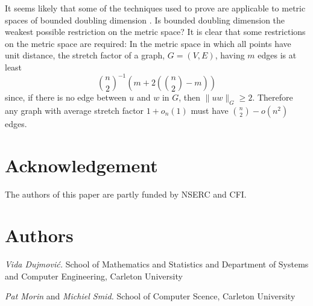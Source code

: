 \documentclass{patmorin}
\begin{document}
It seems likely that some of the techniques used to prove
 are applicable to metric spaces of bounded doubling
dimension \cite[Section~10.13]{heinonen:lectures}.  Is bounded doubling
dimension the weakest possible restriction on the metric space?  It is
clear that some restrictions on the metric space are required: In the
metric space in which all points have unit distance, the stretch factor
of a graph, $G=(V,E)$, having $m$ edges is at least
\[
    \binom{n}{2}^{-1}\left(m + 2\left(\binom{n}{2}-m\right)\right) 
\]
since, if there is no edge between $u$ and $w$ in $G$, then $\|uw\|_G
\ge 2$.  Therefore any graph with average stretch factor $1+o_n(1)$
must have $\binom{n}{2}-o(n^2)$ edges.

\section*{Acknowledgement}

The authors of this paper are partly funded by NSERC and CFI.

\section*{Authors}

\noindent\emph{Vida Dujmovi\'c.}
School of Mathematics and Statistics and Department of Systems and Computer Engineering, Carleton University

\noindent\emph{Pat Morin} and \emph{Michiel Smid.}
School of Computer Scence, Carleton University




\end{document}
